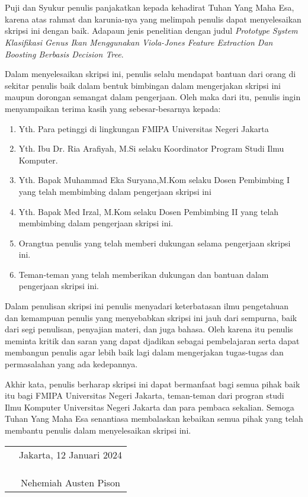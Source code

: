\chapter*{}

Puji dan Syukur penulis panjakatkan kepada kehadirat Tuhan Yang Maha Esa, 
karena atas rahmat dan karunia-nya yang melimpah penulis dapat menyelesaikan
 skripsi ini dengan baik. Adapaun jenis penelitian dengan judul 
\textit{Prototype System Klasifikasi Genus Ikan Menggunakan 
Viola-Jones Feature Extraction Dan Boosting Berbasis Decision Tree}.

Dalam menyelesaikan skripsi ini, penulis selalu mendapat bantuan dari orang 
di sekitar penulis baik dalam bentuk bimbingan dalam mengerjakan skripsi 
ini maupun dorongan semangat dalam pengerjaan. Oleh maka dari itu, penulis 
ingin menyampaikan terima kasih yang sebesar-besarnya kepada:

\begin{enumerate}

	\item{Yth. Para petinggi di lingkungan FMIPA Universitas Negeri Jakarta}
	\item{Yth. Ibu Dr. Ria Arafiyah, M.Si selaku Koordinator Program Studi Ilmu
		Komputer.}
	\item{Yth. Bapak Muhammad Eka Suryana,M.Kom selaku Dosen Pembimbing I 
		yang telah membimbing dalam pengerjaan skripsi ini}
	\item{Yth. Bapak Med Irzal, M.Kom selaku Dosen Pembimbing II yang telah
		membimbing dalam pengerjaan skripsi ini.}
	\item{Orangtua penulis yang telah memberi dukungan selama pengerjaan
		 skripsi ini.}
	\item{Teman-teman yang telah memberikan dukungan dan bantuan dalam 
		pengerjaan skripsi ini.}
	
\end{enumerate}

Dalam penulisan skripsi ini penulis menyadari keterbatasan ilmu 
pengetahuan dan kemampuan penulis yang menyebabkan skripsi ini jauh dari 
sempurna, baik dari segi penulisan, penyajian materi, dan juga bahasa. Oleh 
karena itu penulis meminta kritik dan saran yang dapat djadikan sebagai 
pembelajaran serta dapat membangun penulis agar lebih baik lagi dalam mengerjakan 
tugas-tugas dan permasalahan yang ada kedepannya.

Akhir kata, penulis berharap skripsi ini dapat bermanfaat bagi semua 
pihak baik itu bagi FMIPA Universitas Negeri Jakarta, teman-teman dari progran 
studi Ilmu Komputer Universitas Negeri Jakarta dan para pembaca sekalian. 
Semoga Tuhan Yang Maha Esa senantiasa membalaskan kebaikan semua pihak yang 
telah membantu penulis dalam menyelesaikan skripsi ini.
\vspace{4cm}

\begin{tabular}{p{7.5cm}c}
	&Jakarta, 12 Januari 2024\\
	&\\
	&\\
	&\\
	&Nehemiah Austen Pison
\end{tabular}
